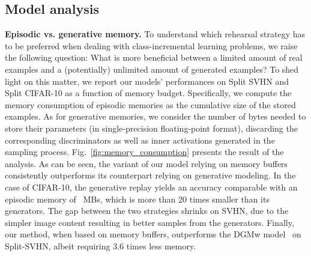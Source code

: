 \documentclass[10pt,twocolumn,letterpaper]{article}
\begin{document}
\subsection{Model analysis}
\label{sec:model_analysis}
\textbf{Episodic vs. generative memory.}
To understand which rehearsal strategy has to be preferred when dealing with class-incremental learning problems, we raise the following question: What is more beneficial between a limited amount of real examples and a (potentially) unlimited amount of generated examples? To shed light on this matter, we report our models' performances on Split SVHN and Split CIFAR-10 as a function of memory budget.
Specifically, we compute the memory consumption of episodic memories as the cumulative size of the stored examples. As for generative memories, we consider the number of bytes needed to store their parameters (in single-precision floating-point format), discarding the corresponding discriminators as well as inner activations generated in the sampling process.
Fig.~\ref{fig:memory_consumption} presents the result of the analysis. 
As can be seen, the variant of our model relying on memory buffers consistently outperforms its counterpart relying on generative modeling.
In the case of CIFAR-10, the generative replay yields an accuracy comparable with an episodic memory of ~MBs, which is more than 20 times smaller than its generators. 
The gap between the two strategies shrinks on SVHN, due to the simpler image content resulting in better samples from the generators.
Finally, our method, when based on memory buffers, outperforms the DGMw model~\cite{ostapenko2019learning} on Split-SVHN, albeit requiring 3.6 times less memory.
\end{document}
